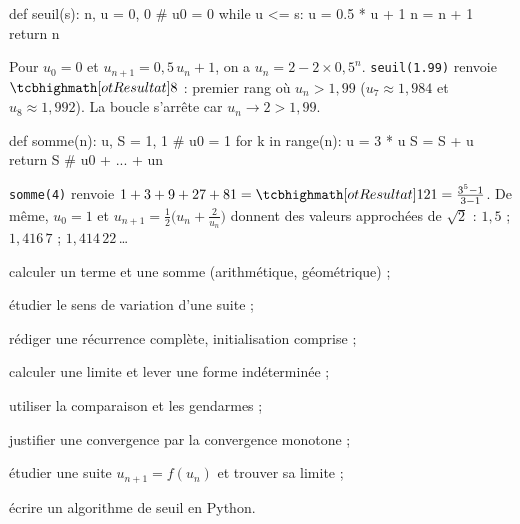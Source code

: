 \noindent
\begin{minipage}[t]{0.485\linewidth}
\begin{python}
def seuil(s):
    n, u = 0, 0         # u0 = 0
    while u <= s:
        u = 0.5 * u + 1
        n = n + 1
    return n
\end{python}
{\fontsize{9.4}{11.8}\selectfont\RaggedRight Pour $u_0=0$ et $u_{n+1}=0{,}5\,u_n+1$, on a
$u_n=2-2\times0{,}5^{n}$. \texttt{seuil(1.99)} renvoie $\res{8}$ : premier rang où $u_n>1{,}99$
($u_7\approx1{,}984$ et $u_8\approx1{,}992$). La boucle s'arrête car $u_n\to2>1{,}99$.\par}
\end{minipage}\hfill
\begin{minipage}[t]{0.485\linewidth}
\begin{python}
def somme(n):
    u, S = 1, 1         # u0 = 1
    for k in range(n):
        u = 3 * u
        S = S + u
    return S            # u0 + ... + un
\end{python}
{\fontsize{9.4}{11.8}\selectfont\RaggedRight \texttt{somme(4)} renvoie
$1+3+9+27+81=\res{121}=\frac{3^{5}-1}{3-1}$. De même, $u_0=1$ et
$u_{n+1}=\frac12\bigl(u_n+\frac{2}{u_n}\bigr)$ donnent des valeurs approchées de $\sqrt2$ :
$1{,}5$ ; $1{,}416\,7$ ; $1{,}414\,22$\,…\par}
\end{minipage}


\begin{jesais}
  \item calculer un terme et une somme (arithmétique, géométrique) ;
  \item étudier le sens de variation d'une suite ;
  \item rédiger une récurrence complète, initialisation comprise ;
  \item calculer une limite et lever une forme indéterminée ;
  \item utiliser la comparaison et les gendarmes ;
  \item justifier une convergence par la convergence monotone ;
  \item étudier une suite $u_{n+1}=f(u_n)$ et trouver sa limite ;
  \item écrire un algorithme de seuil en Python.
\end{jesais}

